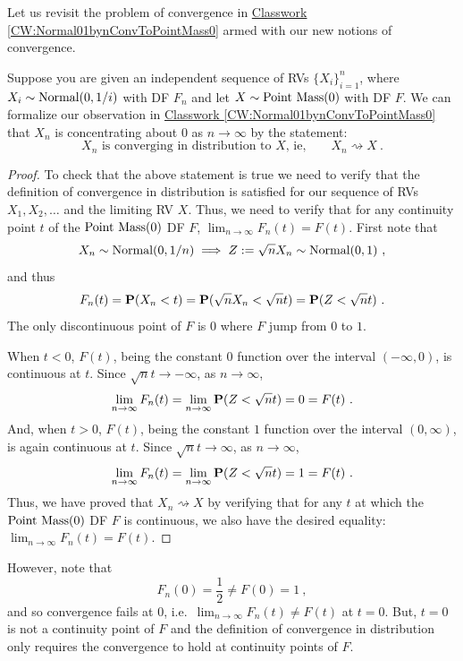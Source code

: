 Let us revisit the problem of convergence in \hyperref[CW:Normal01bynConvToPointMass0]{Classwork \ref*{CW:Normal01bynConvToPointMass0}} armed with our new notions of convergence.
\begin{example}\label{EX:Normal01bynConvinDistToPointMass0}
Suppose you are given an independent sequence of RVs $\{X_i \}_{i=1}^n$, where $X_i \sim \mbox{{\rm Normal}}(0,1/i)$ with DF $F_n$ and let $X \sim \mbox{{\rm Point~Mass}}(0)$ with DF $F$.  We can formalize our observation in \hyperref[CW:Normal01bynConvToPointMass0]{Classwork \ref*{CW:Normal01bynConvToPointMass0}} that $X_n$ is concentrating about $0$ as $n \to \infty$ by the statement:
\[
\text{$X_n$ is converging in distribution to $X$, ie,} \qquad X_n \rightsquigarrow X \ .
\]
{\normalsize
\begin{proof}
To check that the above statement is true we need to verify that the definition of convergence in distribution is satisfied for our sequence of RVs $X_1,X_2,\ldots$ and the limiting RV $X$.  Thus, we need to verify that for any continuity point $t$ of the $\mbox{{\rm Point~Mass}}(0)$ DF $F$, $\lim_{n \to \infty} F_n(t)=F(t)$.  First note that 
\[
X_n \sim \mbox{{\rm Normal}}(0,1/n) \implies Z := \sqrt{n} X_n \sim \mbox{{\rm Normal}}(0,1) \ ,
\]
and thus
\[
F_n(t) = \mathbf{P}(X_n < t) = \mathbf{P}(\sqrt{n} X_n < \sqrt{n} t) = \mathbf{P}(Z < \sqrt{n} t) \ .
\]
The only discontinuous point of $F$ is $0$ where $F$ jump from $0$ to $1$.  

When $t < 0$, $F(t)$, being the constant $0$ function over the interval $(-\infty,0)$, is continuous at $t$.  Since $\sqrt{n} t \to -\infty$, as $n \to \infty$,
\[
\lim_{n \to \infty} F_n(t)  = \lim_{n \to \infty} \mathbf{P}(Z < \sqrt{n} t) = 0 = F(t) \ .
\]
And, when $t >0$, $F(t)$, being the constant $1$ function over the interval $(0,\infty)$, is again continuous at $t$.  Since $\sqrt{n} t \to \infty$, as $n \to \infty$,
\[
\lim_{n \to \infty} F_n(t)  = \lim_{n \to \infty} \mathbf{P}(Z < \sqrt{n} t) = 1 = F(t) \ .
\]
Thus, we have proved that $X_n \rightsquigarrow X$ by verifying that for any $t$ at which the $\mbox{{\rm Point~Mass}}(0)$ DF $F$ is continuous, we also have the desired equality: $\lim_{n \to \infty} F_n(t)=F(t)$.
\end{proof}
However, note that 
\[
F_n(0)=\frac{1}{2} \neq F(0)=1 \ ,
\]
and so convergence fails at $0$, i.e.~$\lim_{n \to \infty}F_n(t) \neq F(t)$ at $t=0$.  But, $t=0$ is not a continuity point of $F$ and the definition of convergence in distribution only requires the convergence to hold at continuity points of $F$.
}
\end{example}

